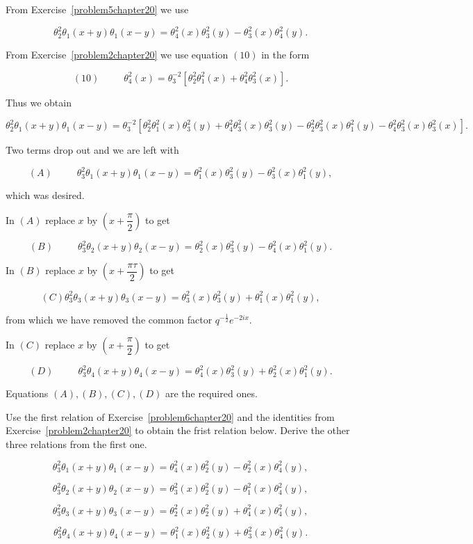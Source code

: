 \begin{solution}
From Exercise~\ref{problem5chapter20} we use

$$\theta_2^2 \theta_1(x+y) \theta_1(x-y) = \theta_4^2(x) \theta_3^2(y) - \theta_3^2(x) \theta_4^2(y).$$

From Exercise~\ref{problem2chapter20} we use equation $(10)$ in the form

$$(10) \hspace{30pt} \theta_4^2(x) = \theta_3^{-2} [\theta_2^2 \theta_1^2(x) + \theta_4^2 \theta_3^2(x)].$$

Thus we obtain

$$\theta_2^2 \theta_1(x+y)\theta_1(x-y) = \theta_3^{-2} [\theta_2^2 \theta_1^2(x) \theta_3^2(y) + \theta_4^2 \theta_3^2(x) \theta_3^2(y) - \theta_2^2 \theta_3^2 (x) \theta_1^2(y) - \theta_4^2 \theta_3^2(x) \theta_3^2(x)].$$

Two terms drop out and we are left with

$$(A) \hspace{30pt} \theta_3^2 \theta_1(x+y) \theta_1(x-y) = \theta_1^2(x) \theta_3^2(y) - \theta_3^2(x) \theta_1^2(y),$$

which was desired.

In $(A)$ replace $x$ by $\left( x + \dfrac{\pi}{2} \right)$ to get

$$(B) \hspace{30pt} \theta_3^2 \theta_2(x+y) \theta_2(x-y) = \theta_2^2(x) \theta_3^2(y) - \theta_4^2(x) \theta_1^2(y).$$

In $(B)$ replace $x$ by $\left( x + \dfrac{\pi \tau}{2} \right)$ to get

$$(C) \theta_3^2 \theta_3(x+y) \theta_3(x-y) = \theta_3^2(x) \theta_3^2(y) + \theta_1^2(x) \theta_1^2(y),$$

from which we have removed the common factor $q^{-\frac{1}{2}} e^{-2ix}$.

In $(C)$ replace $x$ by $\left( x + \dfrac{\pi}{2} \right)$ to get

$$(D) \hspace{30pt} \theta_3^2 \theta_4(x+y) \theta_4(x-y) = \theta_4^2(x) \theta_3^2(y) + \theta_2^2(x) \theta_1^2(y).$$

Equations $(A), (B), (C), (D)$ are the required ones.
\end{solution}
\begin{problem}\label{problem7chapter20}
Use the first relation of Exercise~\ref{problem6chapter20} and the identities from Exercise~\ref{problem2chapter20} to obtain the frist relation below. Derive the other three relations from the first one.

$$\theta_3^2\theta_1(x+y)\theta_1(x-y) = \theta_4^2(x)\theta_2^2(y)-\theta_2^2(x)\theta_4^2(y),$$

$$\theta_3^2\theta_2(x+y)\theta_2(x-y)=\theta_3^2(x)\theta_2^2(y)-\theta_1^2(x)\theta_4^2(y),$$

$$\theta_3^2\theta_3(x+y)\theta_3(x-y)=\theta_2^2(x)\theta_2^2(y)+\theta_4^2(x)\theta_4^2(y),$$

$$\theta_3^2\theta_4(x+y)\theta_4(x-y)=\theta_1^2(x)\theta_2^2(y)+\theta_3^2(x)\theta_4^2(y).$$
\end{problem}
